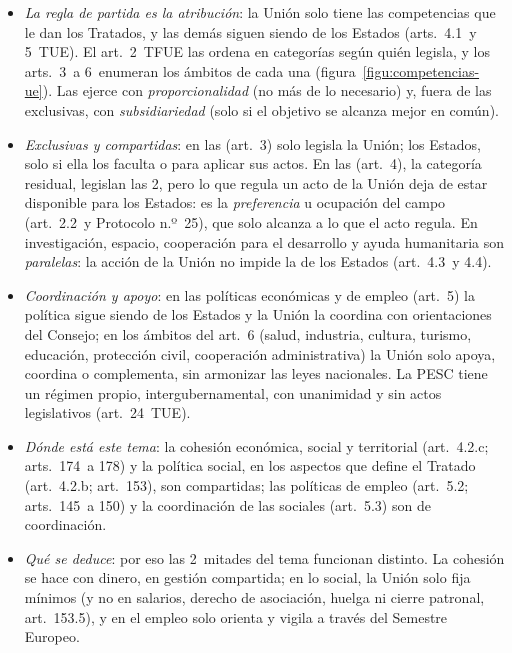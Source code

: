 \documentclass[11pt]{article}
\begin{document}
\begin{itemize}
\item \emph{La regla de partida es la atribución}: la Unión solo tiene las competencias que le dan los Tratados, y las demás siguen siendo de los Estados (arts.~4.1~y 5~TUE). El art.~2~TFUE las ordena en categorías según quién legisla, y los arts.~3~a 6~enumeran los ámbitos de cada una (figura~\ref{figu:competencias-ue}). Las ejerce con \emph{proporcionalidad} (no más de lo necesario) y, fuera de las exclusivas, con \emph{subsidiariedad} (solo si el objetivo se alcanza mejor en común).
\item \emph{Exclusivas y compartidas}: en las  (art.~3) solo legisla la Unión; los Estados, solo si ella los faculta o para aplicar sus actos. En las  (art.~4), la categoría residual, legislan las 2, pero lo que regula un acto de la Unión deja de estar disponible para los Estados: es la \emph{preferencia} u ocupación del campo (art.~2.2~y Protocolo n.º~25), que solo alcanza a lo que el acto regula. En investigación, espacio, cooperación para el desarrollo y ayuda humanitaria son \emph{paralelas}: la acción de la Unión no impide la de los Estados (art.~4.3~y 4.4).
\item \emph{Coordinación y apoyo}: en las políticas económicas y de empleo (art.~5) la política sigue siendo de los Estados y la Unión la coordina con orientaciones del Consejo; en los ámbitos del art.~6 (salud, industria, cultura, turismo, educación, protección civil, cooperación administrativa) la Unión solo apoya, coordina o complementa, sin armonizar las leyes nacionales. La PESC tiene un régimen propio, intergubernamental, con unanimidad y sin actos legislativos (art.~24~TUE).
\item \emph{Dónde está este tema}: la cohesión económica, social y territorial (art.~4.2.c; arts.~174~a 178) y la política social, en los aspectos que define el Tratado (art.~4.2.b; art.~153), son compartidas; las políticas de empleo (art.~5.2; arts.~145~a 150) y la coordinación de las sociales (art.~5.3) son de coordinación.
\item \emph{Qué se deduce}: por eso las 2~mitades del tema funcionan distinto. La cohesión se hace con dinero, en gestión compartida; en lo social, la Unión solo fija mínimos (y no en salarios, derecho de asociación, huelga ni cierre patronal, art.~153.5), y en el empleo solo orienta y vigila a través del Semestre Europeo.
\end{itemize}

\begin{infografia}[H]
\centering
\caption{El reparto de competencias de la Unión (arts.~2~a 6~TFUE): la cohesión, la política social y el empleo}\label{figu:competencias-ue}
\end{infografia}
\end{document}
